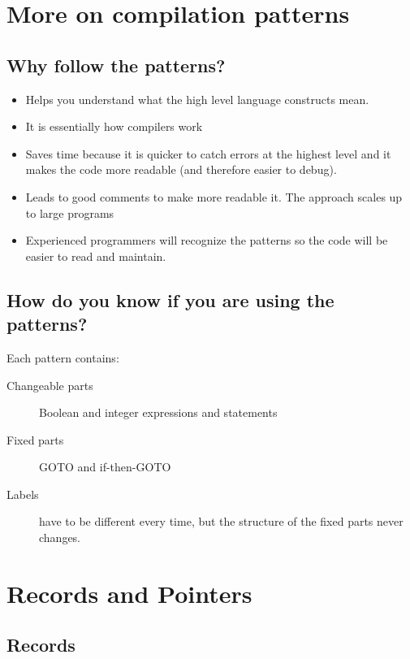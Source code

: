 \section{More on compilation patterns}\label{sec:more_on_compilation_patterns}

\subsection{Why follow the patterns?}\label{sub:why_follow_the_patterns_}

\begin{itemize}
    \item Helps you understand what the high level language constructs mean.
    \item It is essentially how compilers work
    \item Saves time because it is quicker to catch errors at the highest level and it makes the code more readable (and therefore easier to debug).
    \item Leads to good comments to make more readable it.
          The approach scales up to large programs
    \item Experienced programmers will recognize the patterns so the code will be easier to read and maintain.
\end{itemize}

\subsection{How do you know if you are using the patterns?}\label{sub:how_do_you_know_if_you_are_using_the_patterns_}

Each pattern contains:
\begin{description}
    \item[Changeable parts] Boolean and integer expressions and statements
    \item[Fixed parts] GOTO and if-then-GOTO
    \item[Labels] have to be different every time, but the structure of the fixed parts never changes.
\end{description}

\section{Records and Pointers}\label{sec:records_and_pointers}

\subsection{Records}\label{sub:records}

